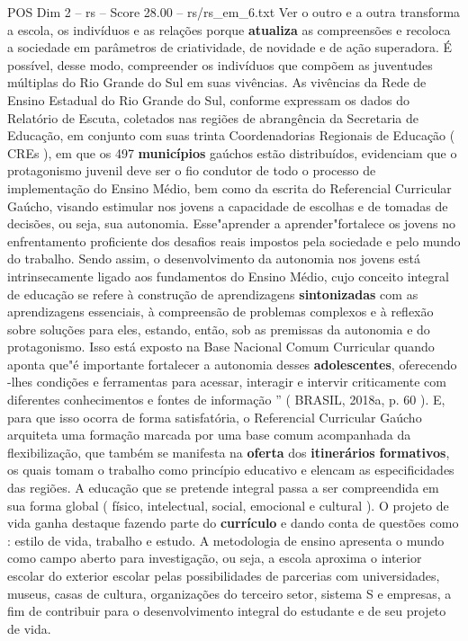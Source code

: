 \begin{textsample}{POS Dim 2 – rs – Score 28.00 – rs/rs\_em\_6.txt}
Ver o outro e a outra transforma a escola, os indivíduos e as relações porque \textbf{atualiza} as compreensões e recoloca a sociedade em parâmetros de criatividade, de novidade e de ação superadora.
É possível, desse modo, compreender os indivíduos que compõem as juventudes múltiplas do Rio Grande do Sul em suas vivências.
As vivências da Rede de Ensino Estadual do Rio Grande do Sul, conforme expressam os dados do Relatório de Escuta, coletados nas regiões de abrangência da Secretaria de Educação, em conjunto com suas trinta Coordenadorias Regionais de Educação ( CREs ), em que os 497 \textbf{municípios} gaúchos estão distribuídos, evidenciam que o protagonismo juvenil deve ser o fio condutor de todo o processo de implementação do Ensino Médio, bem como da escrita do Referencial Curricular Gaúcho, visando estimular nos jovens a capacidade de escolhas e de tomadas de decisões, ou seja, sua autonomia.
Esse"aprender a aprender"fortalece os jovens no enfrentamento proficiente dos desafios reais impostos pela sociedade e pelo mundo do trabalho.
Sendo assim, o desenvolvimento da autonomia nos jovens está intrinsecamente ligado aos fundamentos do Ensino Médio, cujo conceito integral de educação se refere à construção de aprendizagens \textbf{sintonizadas} com as aprendizagens essenciais, à compreensão de problemas complexos e à reflexão sobre soluções para eles, estando, então, sob as premissas da autonomia e do protagonismo.
Isso está exposto na Base Nacional Comum Curricular quando aponta que"é importante fortalecer a autonomia desses \textbf{adolescentes}, oferecendo -lhes condições e ferramentas para acessar, interagir e intervir criticamente com diferentes conhecimentos e fontes de informação ” ( BRASIL, 2018a, p. 60 ).
E, para que isso ocorra de forma satisfatória, o Referencial Curricular Gaúcho arquiteta uma formação marcada por uma base comum acompanhada da flexibilização, que também se manifesta na \textbf{oferta} dos \textbf{itinerários} \textbf{formativos}, os quais tomam o trabalho como princípio educativo e elencam as especificidades das regiões.
A educação que se pretende integral passa a ser compreendida em sua forma global ( físico, intelectual, social, emocional e cultural ).
O projeto de vida ganha destaque fazendo parte do \textbf{currículo} e dando conta de questões como : estilo de vida, trabalho e estudo.
A metodologia de ensino apresenta o mundo como campo aberto para investigação, ou seja, a escola aproxima o interior escolar do exterior escolar pelas possibilidades de parcerias com universidades, museus, casas de cultura, organizações do terceiro setor, sistema S e empresas, a fim de contribuir para o desenvolvimento integral do estudante e de seu projeto de vida.

\end{textsample}
